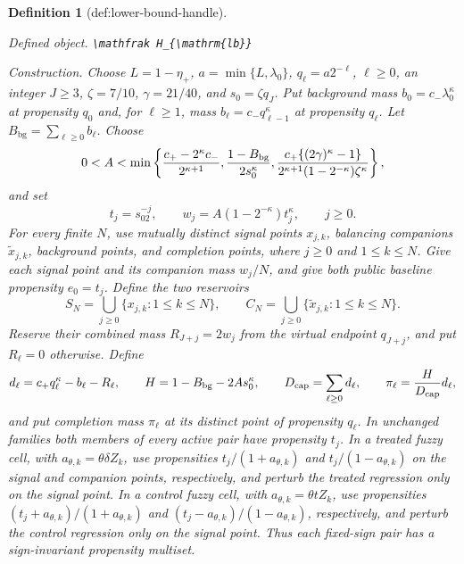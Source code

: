 \documentclass{article}
\newtheorem{definition}{Definition}
\begin{document}
\begin{definition}[def:lower-bound-handle]\label{def:lower-bound-handle}
\par\smallskip\noindent\emph{Defined object.} \texttt{\textbackslash{}\allowbreak{}mathfrak H\_\allowbreak{}\{\textbackslash{}\allowbreak{}mathrm\{lb\}\allowbreak{}\}\allowbreak{}}
\par\smallskip\noindent\emph{Construction.} Choose \(L=1-\eta_+\), \(a=\min\{L,\lambda_0\}\),
\(q_\ell=a2^{-\ell}\), \(\ell\geq0\), an integer \(J\geq3\),
\(\zeta=7/10\), \(\gamma=21/40\), and \(s_0=\zeta q_J\).  Put
background mass \(b_0=c_-\lambda_0^\kappa\) at propensity \(q_0\) and,
for \(\ell\geq1\), mass \(b_\ell=c_-q_{\ell-1}^\kappa\) at propensity
\(q_\ell\).  Let \(B_{\mathrm{bg}}=\sum_{\ell\geq0}b_\ell\).  Choose
\[
0<A<\min\left\{
{c_+-2^\kappa c_-\over2^{\kappa+1}},
{1-B_{\mathrm{bg}}\over2s_0^\kappa},
{c_+\{(2\gamma)^\kappa-1\}
 \over2^{\kappa+1}(1-2^{-\kappa})\zeta^\kappa}
\right\},
\]
and set
\[
t_j=s_02^{-j},\quad\quad
w_j=A(1-2^{-\kappa})t_j^\kappa,\quad\quad j\geq0.
\]
For every finite \(N\), use mutually distinct signal points \(x_{j,k}\),
balancing companions \(\widetilde x_{j,k}\), background points, and completion
points, where \(j\geq0\) and \(1\leq k\leq N\).  Give each signal point and
its companion mass \(w_j/N\), and give both public baseline propensity
\(e_0=t_j\).  Define the two reservoirs
\[
S_N=\bigcup_{j\geq0}\{x_{j,k}:1\leq k\leq N\},\quad\quad
C_N=\bigcup_{j\geq0}\{\widetilde x_{j,k}:1\leq k\leq N\}.
\]
Reserve their combined mass \(R_{J+j}=2w_j\) from the virtual endpoint
\(q_{J+j}\), and put \(R_\ell=0\) otherwise.  Define
\[
d_\ell=c_+q_\ell^\kappa-b_\ell-R_\ell,\quad\quad
H=1-B_{\mathrm{bg}}-2As_0^\kappa,\quad\quad
D_{\mathrm{cap}}=\sum_{\ell\geq0}d_\ell,\quad\quad
\pi_\ell={H\over D_{\mathrm{cap}}}d_\ell,
\]
and put completion mass \(\pi_\ell\) at its distinct point of propensity
\(q_\ell\).  In unchanged families both members of every active pair have
propensity \(t_j\).  In a treated fuzzy cell, with
\(a_{\theta,k}=\theta\delta Z_k\), use propensities
\(t_j/(1+a_{\theta,k})\) and \(t_j/(1-a_{\theta,k})\) on the signal and
companion points, respectively, and perturb the treated regression only on the
signal point.  In a control fuzzy cell, with \(a_{\theta,k}=\theta tZ_k\), use
propensities \((t_j+a_{\theta,k})/(1+a_{\theta,k})\) and
\((t_j-a_{\theta,k})/(1-a_{\theta,k})\), respectively, and perturb the control
regression only on the signal point.  Thus each fixed-sign pair has a
sign-invariant propensity multiset.


\end{definition}
\end{document}
